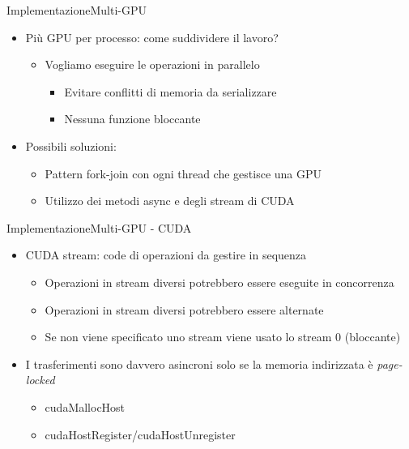 \documentclass{beamer}
\begin{document}
\begin{frame}{Implementazione}{Multi-GPU}
    \begin{itemize}
        \item Più GPU per processo: come suddividere il lavoro?
              \begin{itemize}
                  \item Vogliamo eseguire le operazioni in parallelo
                        \begin{itemize}
                            \item Evitare conflitti di memoria da serializzare
                            \item Nessuna funzione bloccante
                        \end{itemize}
              \end{itemize}
        \item Possibili soluzioni:
              \begin{itemize}
                  \item Pattern fork-join con ogni thread che gestisce una GPU
                  \item \color{red} Utilizzo dei metodi async e degli stream di CUDA
              \end{itemize}
    \end{itemize}
\end{frame}


\begin{frame}{Implementazione}{Multi-GPU - CUDA}
    \begin{itemize}
        \item CUDA stream: code di operazioni da gestire in sequenza
              \begin{itemize}
                  \item Operazioni in stream diversi potrebbero essere eseguite in concorrenza
                  \item Operazioni in stream diversi potrebbero essere alternate
                  \item Se non viene specificato uno stream viene usato lo stream 0 (bloccante)
              \end{itemize}
        \item I trasferimenti sono davvero asincroni solo se la memoria indirizzata è \textit{page-locked}
              \begin{itemize}
                  \item cudaMallocHost
                  \item cudaHostRegister/cudaHostUnregister
              \end{itemize}
    \end{itemize}
\end{frame}
\end{document}
